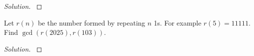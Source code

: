 \documentclass[11pt]{article}
\newenvironment{problem}[2][Problem]{\begin{trivlist}
\item[\hskip \labelsep {\bfseries #1}\hskip \labelsep {\bfseries #2.}]}{\end{trivlist}}
\newenvironment{solution}
  {\renewcommand\qedsymbol{$~$}\begin{proof}[Solution]$ $\par\nobreak\ignorespaces}
  {\end{proof}}
\begin{document}
\begin{solution}
  

  
\end{solution}


\begin{problem}{C (Extra Credit)}
Let $r(n)$ be the number formed by repeating $n$ 1s. For example $r(5)=11111$. Find $\gcd(r(2025),r(103))$.

\end{problem}

\begin{solution}
  

  
\end{solution}
\end{document}

